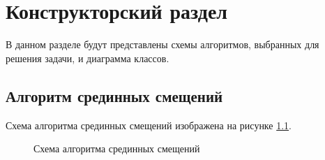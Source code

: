 \chapter{Конструкторский раздел}
\label{cha:design}

В данном разделе будут представлены схемы алгоритмов, выбранных для решения задачи, и диаграмма классов.

\section{Алгоритм срединных смещений}

Схема алгоритма срединных смещений изображена на рисунке \ref{fig:brown_mov_alg}.

\begin{figure}[ph!]
	\caption{Схема алгоритма срединных смещений}
	\label{fig:brown_mov_alg}
\end{figure}

